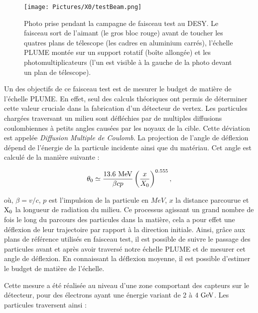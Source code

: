   \begin{figure}
    \centering
    \texttt{[image: Pictures/X0/testBeam.png]}
    \caption{Photo prise pendant la campagne de faisceau test au DESY. Le faisceau sort de l'aimant (le gros bloc rouge) avant de toucher les quatres plans de télescope (les cadres en aluminium carrés), l'échelle PLUME montée sur un support rotatif (boîte allongée) et les photomultiplicateurs (l'un est visible à la gauche de la photo devant un plan de télescope).}
    \label{fig:testBeam_resume}
  \end{figure}

  Un des objectifs de ce faisceau test est de mesurer le budget de matière de l'échelle PLUME.
  En effet, seul des calculs théoriques ont permis de déterminer cette valeur cruciale dans la fabrication d'un détecteur de vertex.
  Les particules chargées traversant un milieu sont défléchies par de multiples diffusions coulombiennes à petits angles causées par les noyaux de la cible.
  Cette déviation est appelée \textit{Diffusion Multiple de Coulomb}.
  La projection de l'angle de déflexion dépend de l'énergie de la particule incidente ainsi que du matériau.
  Cet angle est calculé de la manière suivante :

  \begin{equation}
    \theta_0 \simeq \frac{13.6~\rm{MeV}}{\beta c p} \left(\frac{x}{X_0}\right)^{0.555},
    \label{eq:MSC}
  \end{equation} 

  où, $\beta = v/c$, $p$ est l’impulsion de la particule en $MeV$, $x$ la distance parcourue et $\rm{X_0}$ la longueur de radiation du milieu.
  Ce processus agissant un grand nombre de fois le long du parcours des particules dans la matière, cela a pour effet une déflexion de leur trajectoire par rapport à la direction initiale.
  Ainsi, grâce aux plans de référence utilisés en faisceau test, il est possible de suivre le passage des particules avant et après avoir traversé notre échelle PLUME et de mesurer cet angle de déflexion.
  En connaissant la déflexion moyenne, il est possible d'estimer le budget de matière de l'échelle.
  
  Cette mesure a été réalisée au niveau d'une zone comportant des capteurs sur le détecteur, pour des électrons ayant une énergie variant de 2 à $4~\rm{GeV}$.
  Les particules traversent ainsi :

